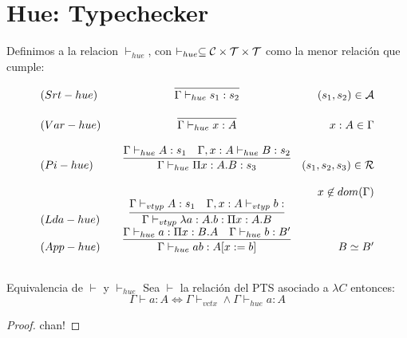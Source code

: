 \section{Hue: Typechecker}

\begin{definition}
Definimos a la relacion $\vdash_{hue}$, con $\vdash_{hue} \subseteq \mathcal{C}\times\mathcal{T}\times\mathcal{T}$ como
la menor relación que cumple:


\[
\begin{array}{llcr}
	(Srt-hue) & &\infer{\Gamma \vdash_{hue} s_{1} : s_{2}}{} & (s_{1},s_{2}) \in\cA \\ \\ 
	(Var-hue) & &\infer{\Gamma \vdash_{hue} x : A}{} & x:A \in\Gamma \\ \\

	(Pi-hue)  & &\infer{\Gamma \vdash_{hue} \Pi x:A.B : s_{3}}{\Gamma\vdash_{hue} A:s_{1} & \Gamma, x:A \vdash_{hue} B:s_{2}} &  (s_1,s_2,s_3)\in\cR\\ \\
               & &                                             & x \not\in dom(\Gamma)\\
	(Lda-hue) & &\infer{\Gamma \vdash_{vtyp} \lambda a:A.b : \Pi x:A.B }{\Gamma\vdash_{vtyp} A:s_{1} & \Gamma, x:A \vdash_{vtyp} b:
} & \\
	(App-hue) & &\infer{\Gamma \vdash_{hue} a b : A[x:= b] }{\Gamma\vdash_{hue} a : \Pi x:B.A & \Gamma \vdash_{hue} b:B'} &  B\simeq B' \\ \\
	
\end{array}
\]

\end{definition}

\begin{lemma}{Equivalencia de $\vdash$ y $\vdash_{hue}$}
Sea $\vdash$ la relación del PTS asociado a $\lambda C$  entonces:
\begin{equation}
\Gamma \vdash a : A \Leftrightarrow \Gamma \vdash_{vctx} \land \Gamma \vdash_{hue} a:A
\end{equation}
\end{lemma}

\begin{proof}
chan!
\end{proof}

